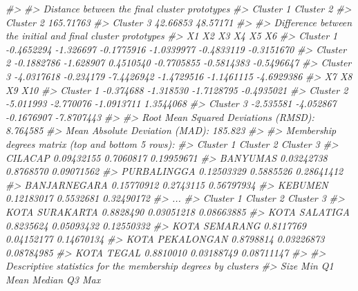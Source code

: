 \documentclass[
  oneside]{book}
\newenvironment{Shaded}{\begin{snugshade}}{\end{snugshade}}
\newcommand{\CommentTok}[1]{\textcolor[rgb]{0.56,0.35,0.01}{\textit{#1}}}
\begin{document}
\begin{Shaded}
\begin{Highlighting}[]
\CommentTok{\#\textgreater{} }
\CommentTok{\#\textgreater{} Distance between the final cluster prototypes}
\CommentTok{\#\textgreater{}           Cluster 1 Cluster 2}
\CommentTok{\#\textgreater{} Cluster 2 165.71763          }
\CommentTok{\#\textgreater{} Cluster 3  42.66853  48.57171}
\CommentTok{\#\textgreater{} }
\CommentTok{\#\textgreater{} Difference between the initial and final cluster prototypes}
\CommentTok{\#\textgreater{}                   X1        X2         X3         X4         X5         X6}
\CommentTok{\#\textgreater{} Cluster 1 {-}0.4652294 {-}1.326697 {-}0.1775916 {-}1.0339977 {-}0.4833119 {-}0.3151670}
\CommentTok{\#\textgreater{} Cluster 2 {-}0.1882786 {-}1.628907  0.4510540 {-}0.7705855 {-}0.5814383 {-}0.5496647}
\CommentTok{\#\textgreater{} Cluster 3 {-}4.0317618 {-}0.234179 {-}7.4426942 {-}1.4729516 {-}1.1461115 {-}4.6929386}
\CommentTok{\#\textgreater{}                  X7        X8         X9        X10}
\CommentTok{\#\textgreater{} Cluster 1 {-}0.374688 {-}1.318530 {-}1.7128795 {-}0.4935021}
\CommentTok{\#\textgreater{} Cluster 2 {-}5.011993 {-}2.770076 {-}1.0913711  1.3544068}
\CommentTok{\#\textgreater{} Cluster 3 {-}2.535581 {-}4.052867 {-}0.1676907 {-}7.8707443}
\CommentTok{\#\textgreater{} }
\CommentTok{\#\textgreater{} Root Mean Squared Deviations (RMSD): 8.764585 }
\CommentTok{\#\textgreater{} Mean Absolute Deviation (MAD): 185.823 }
\CommentTok{\#\textgreater{} }
\CommentTok{\#\textgreater{} Membership degrees matrix (top and bottom 5 rows): }
\CommentTok{\#\textgreater{}               Cluster 1 Cluster 2  Cluster 3}
\CommentTok{\#\textgreater{} CILACAP      0.09432155 0.7060817 0.19959671}
\CommentTok{\#\textgreater{} BANYUMAS     0.03242738 0.8768570 0.09071562}
\CommentTok{\#\textgreater{} PURBALINGGA  0.12503329 0.5885526 0.28641412}
\CommentTok{\#\textgreater{} BANJARNEGARA 0.15770912 0.2743115 0.56797934}
\CommentTok{\#\textgreater{} KEBUMEN      0.12183017 0.5532681 0.32490172}
\CommentTok{\#\textgreater{} ...}
\CommentTok{\#\textgreater{}                 Cluster 1  Cluster 2  Cluster 3}
\CommentTok{\#\textgreater{} KOTA SURAKARTA  0.8828490 0.03051218 0.08663885}
\CommentTok{\#\textgreater{} KOTA SALATIGA   0.8235624 0.05093432 0.12550332}
\CommentTok{\#\textgreater{} KOTA SEMARANG   0.8117769 0.04152177 0.14670134}
\CommentTok{\#\textgreater{} KOTA PEKALONGAN 0.8798814 0.03226873 0.08784985}
\CommentTok{\#\textgreater{} KOTA TEGAL      0.8810010 0.03188749 0.08711147}
\CommentTok{\#\textgreater{} }
\CommentTok{\#\textgreater{} Descriptive statistics for the membership degrees by clusters}
\CommentTok{\#\textgreater{}           Size       Min        Q1      Mean    Median        Q3       Max}

\end{Highlighting}
\end{Shaded}
\end{document}
